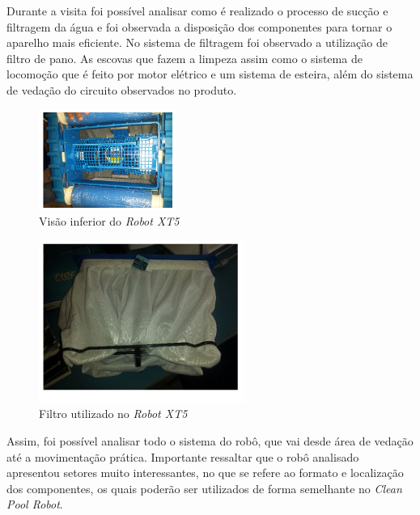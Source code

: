 Durante a visita foi possível analisar como é realizado o processo de sucção e 
filtragem da água e foi observada a disposição dos componentes para tornar o 
aparelho mais eficiente. No sistema de filtragem foi observado a utilização de 
filtro de pano. As escovas que fazem a limpeza assim como o sistema de 
locomoção que é feito por motor elétrico e um sistema de esteira, além do 
sistema de vedação do circuito observados no produto.

\begin{figure}[!h]
   \centering
    \includegraphics[width=0.4\textwidth]{figures/bottom_view_robot.jpg}
    \caption{Visão inferior do \textit{Robot XT5}}
    \label{fig:bottow_view_robot}
\end{figure}
\FloatBarrier

\begin{figure}[!h]
   \centering
    \includegraphics[width=0.6\textwidth]{figures/robot_filter.jpg}
    \caption{Filtro utilizado no \textit{Robot XT5}}
    \label{fig:robot_filter}
\end{figure}
\FloatBarrier

Assim, foi possível analisar todo o sistema do robô, que vai desde área de 
vedação até a movimentação prática. Importante ressaltar que o robô 
analisado apresentou setores muito interessantes, no que se refere ao formato 
e localização dos componentes, os quais poderão ser utilizados de forma 
semelhante no \textit{Clean Pool Robot}.

